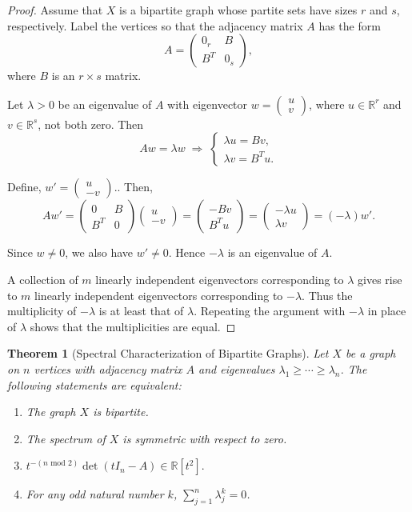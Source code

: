 \documentclass{amsart}
\theoremstyle{plain}
\newtheorem{theorem}{Theorem}[section]
\begin{document}
\begin{proof}
Assume that $X$ is a bipartite graph whose partite sets have sizes $r$ and $s$, 
respectively. Label the vertices so that the adjacency matrix $A$ has the form
\[
A = \begin{pmatrix}
0_r & B \\
B^T & 0_s
\end{pmatrix},
\]
where $B$ is an $r \times s$ matrix.

Let $\lambda > 0$ be an eigenvalue of $A$ with eigenvector $w = \begin{pmatrix} u \\ v \end{pmatrix}$,
where $u \in \mathbb{R}^r$ and $v \in \mathbb{R}^s$, not both zero. Then
\[
Aw = \lambda w
\;\Longrightarrow\;
\begin{cases}
\lambda u = Bv, \\
\lambda v = B^T u.
\end{cases}
\]

Define, $w' = \begin{pmatrix} u \\ -v \end{pmatrix}.$. Then,
\[
Aw' = 
\begin{pmatrix}
0 & B \\
B^T & 0
\end{pmatrix}
\begin{pmatrix}
u \\ -v
\end{pmatrix}
=
\begin{pmatrix}
- Bv \\
B^T u
\end{pmatrix}
=
\begin{pmatrix}
-\lambda u \\
\lambda v
\end{pmatrix}
= (-\lambda) w'.
\]

Since $w \neq 0$, we also have $w' \neq 0$. Hence $-\lambda$ is an eigenvalue of $A$.

A collection of $m$ linearly independent eigenvectors corresponding to $\lambda$ 
gives rise to $m$ linearly independent eigenvectors corresponding to $-\lambda$. 
Thus the multiplicity of $-\lambda$ is at least that of $\lambda$. Repeating the 
argument with $-\lambda$ in place of $\lambda$ shows that the multiplicities are equal.
\end{proof}

\begin{theorem}[Spectral Characterization of Bipartite Graphs]
Let $X$ be a graph on $n$ vertices with adjacency matrix $A$ and eigenvalues 
$\lambda_1 \ge \cdots \ge \lambda_n$. The following statements are equivalent:
\begin{enumerate}
\item The graph $X$ is bipartite.
\item The spectrum of $X$ is symmetric with respect to zero.
\item $ t^{-(n\text{ mod }2)}\det\left( tI_n-A \right)\in \mathbb{R}[t^2].$
\item For any odd natural number $k$, $\sum_{j=1}^n \lambda_j^k = 0$.
\end{enumerate}
\end{theorem}
\end{document}
